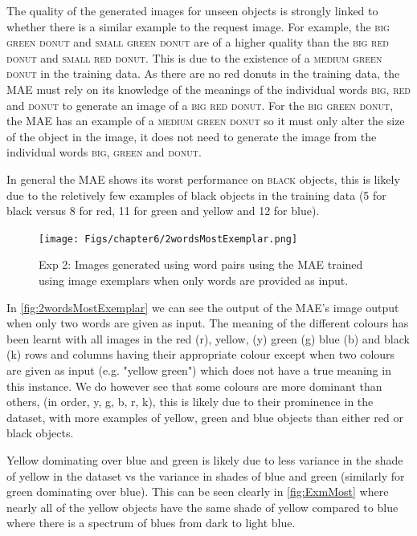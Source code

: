 The quality of the generated images for unseen objects is strongly linked to whether there is a similar example to the request image. For example, the \textsc{big green donut} and \textsc{small green donut} are of a higher quality than the \textsc{big red donut} and \textsc{small red donut}. This is due to the existence of a \textsc{medium green donut} in the training data. As there are no red donuts in the training data, the MAE must rely on its knowledge of the meanings of the individual words \textsc{big}, \textsc{red} and \textsc{donut} to generate an image of a \textsc{big red donut}. For the \textsc{big green donut}, the MAE has an example of a \textsc{medium green donut} so it must only alter the size of the object in the image, it does not need to generate the image from the individual words \textsc{big}, \textsc{green} and \textsc{donut}.

In general the MAE shows its worst performance on \textsc{black} objects, this is likely due to the reletively few examples of black objects in the training data (5 for black versus 8 for red, 11 for green and yellow and 12 for blue).

\begin{figure}[ht]
    \centering
    \texttt{[image: Figs/chapter6/2wordsMostExemplar.png]}
    \caption{Exp 2: Images generated using word pairs using the MAE trained using image exemplars when only words are provided as input.}
    \label{fig:2wordsMostExemplar}
\end{figure}


In \autoref{fig:2wordsMostExemplar} we can see the output of the MAE's image output when only two words are given as input. The meaning of the different colours has been learnt with all images in the red (r), yellow, (y) green (g) blue (b) and black (k) rows and columns having their appropriate colour except when two colours are given as input (e.g. "yellow green") which does not have a true meaning in this instance. We do however see that some colours are more dominant than others, (in order, y, g, b, r, k), this is likely due to their prominence in the dataset, with more examples of yellow, green and blue objects than either red or black objects. 

Yellow dominating over blue and green is likely due to less variance in the shade of yellow in the dataset vs the variance in shades of blue and green (similarly for green dominating over blue). This can be seen clearly in \autoref{fig:ExmMost} where nearly all of the yellow objects have the same shade of yellow compared to blue where there is a spectrum of blues from dark to light blue.


